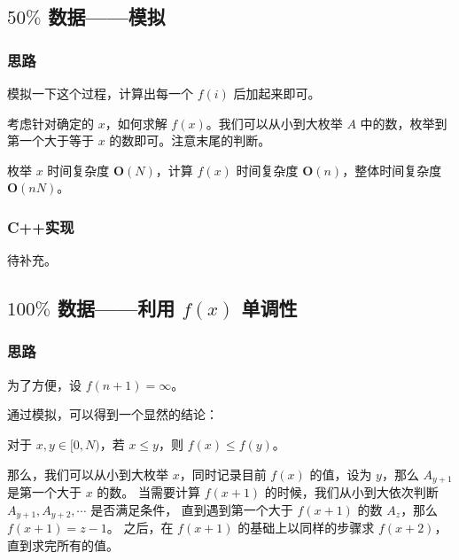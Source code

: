 
% 

\subsection{\texorpdfstring{$50\%$}{50\%} 数据——模拟}

\subsubsection{思路}

模拟一下这个过程，计算出每一个 $f(i)$ 后加起来即可。

考虑针对确定的 $x$，如何求解 $f(x)$。我们可以从小到大枚举 $A$ 中的数，枚举到第一个大于等于 $x$ 的数即可。注意末尾的判断。

枚举 $x$ 时间复杂度 $\mathbf{O}(N)$，计算 $f(x)$ 时间复杂度 $\mathbf{O}(n)$，整体时间复杂度 $\mathbf{O}(nN)$。

\subsubsection{C++实现}

待补充。

\subsection{\texorpdfstring{$100\%$}{100\%} 数据——利用 \texorpdfstring{$f(x)$}{f(x)} 单调性}

\subsubsection{思路}

为了方便，设 $f(n+1) = \infty$。

通过模拟，可以得到一个显然的结论：

\begin{theorem}[$f(x)$的单调性] \label{thm:fx_monotonicity}
  对于 $x,y\in [0,N)$，若 $x \le y$，则 $f(x) \le f(y)$。
\end{theorem}

那么，我们可以从小到大枚举 $x$，同时记录目前 $f(x)$ 的值，设为 $y$，那么 $A_{y+1}$ 是第一个大于 $x$ 的数。
当需要计算 $f(x+1)$ 的时候，我们从小到大依次判断 $A_{y+1},A_{y+2},\cdots$ 是否满足条件，
直到遇到第一个大于 $f(x+1)$ 的数 $A_z$，那么 $f(x+1)=z-1$。
之后，在 $f(x+1)$ 的基础上以同样的步骤求 $f(x+2)$，直到求完所有的值。


